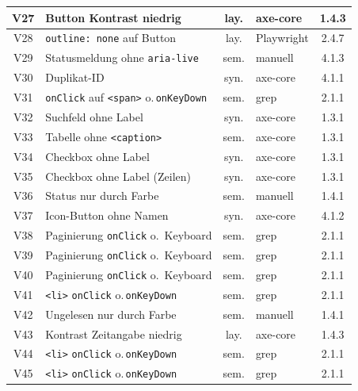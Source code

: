 \begin{longtable}{|c|p{5.8cm}|c|p{3.6cm}|c|}
V27  & Button Kontrast niedrig                   & lay. & axe-core                & 1.4.3 \\ \hline
V28  & \texttt{outline: none} auf Button         & lay. & Playwright              & 2.4.7 \\ \hline
V29  & Statusmeldung ohne \texttt{aria-live}     & sem. & manuell                 & 4.1.3 \\ \hline
V30  & Duplikat-ID                               & syn. & axe-core                & 4.1.1 \\ \hline
V31  & \texttt{onClick} auf \texttt{<span>} o.\,\texttt{onKeyDown} & sem. & grep & 2.1.1 \\ \hline
V32  & Suchfeld ohne Label                       & syn. & axe-core                & 1.3.1 \\ \hline
V33  & Tabelle ohne \texttt{<caption>}           & sem. & axe-core                & 1.3.1 \\ \hline
V34  & Checkbox ohne Label                       & syn. & axe-core                & 1.3.1 \\ \hline
V35  & Checkbox ohne Label (Zeilen)              & syn. & axe-core                & 1.3.1 \\ \hline
V36  & Status nur durch Farbe                    & sem. & manuell                 & 1.4.1 \\ \hline
V37  & Icon-Button ohne Namen                    & syn. & axe-core                & 4.1.2 \\ \hline
V38  & Paginierung \texttt{onClick} o.\ Keyboard & sem. & grep                   & 2.1.1 \\ \hline
V39  & Paginierung \texttt{onClick} o.\ Keyboard & sem. & grep                   & 2.1.1 \\ \hline
V40  & Paginierung \texttt{onClick} o.\ Keyboard & sem. & grep                   & 2.1.1 \\ \hline
V41  & \texttt{<li>} \texttt{onClick} o.\,\texttt{onKeyDown} & sem. & grep    & 2.1.1 \\ \hline
V42  & Ungelesen nur durch Farbe                 & sem. & manuell                 & 1.4.1 \\ \hline
V43  & Kontrast Zeitangabe niedrig               & lay. & axe-core                & 1.4.3 \\ \hline
V44  & \texttt{<li>} \texttt{onClick} o.\,\texttt{onKeyDown} & sem. & grep    & 2.1.1 \\ \hline
V45  & \texttt{<li>} \texttt{onClick} o.\,\texttt{onKeyDown} & sem. & grep    & 2.1.1 \\ \hline

\end{longtable}
